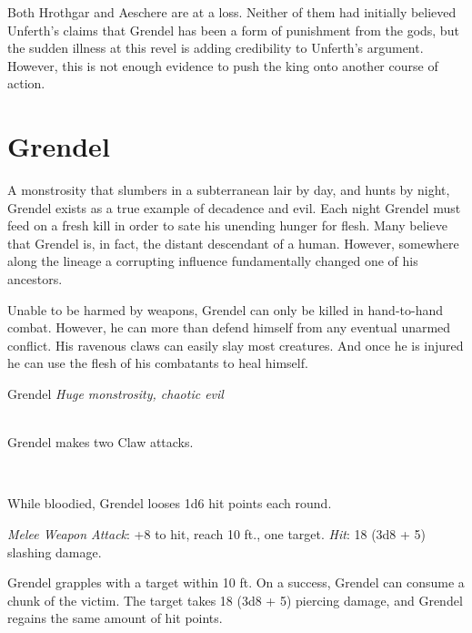 \documentclass[10pt,twoside,twocolumn,openany]{book}
\begin{document}
Both Hrothgar and Aeschere are at a loss. Neither of them had initially believed Unferth's claims that Grendel has been a form of punishment from the gods, but the sudden illness at this revel is adding credibility to Unferth's argument. However, this is not enough evidence to push the king onto another course of action.

\clearpage

\section{\textbf{Grendel}}
A monstrosity that slumbers in a subterranean lair by day, and hunts by night, Grendel exists as a true example of decadence and evil. Each night Grendel must feed on a fresh kill in order to sate his unending hunger for flesh. Many believe that Grendel is, in fact, the distant descendant of a human. However, somewhere along the lineage a corrupting influence fundamentally changed one of his ancestors.

Unable to be harmed by weapons, Grendel can only be killed in hand-to-hand combat. However, he can more than defend himself from any eventual unarmed conflict. His ravenous claws can easily slay most creatures. And once he is injured he can use the flesh of his combatants to heal himself.

\vspace{4.1cm}

\begin{monsterbox}{Grendel}
	\textit{Huge monstrosity, chaotic evil}\\
	\hline
	\basics[%
	armorclass = 12,
	hitpoints  = 105 (10d12 + 40),
	speed      = 60 ft
	]
	\hline
	\stats[
    STR = \stat{25},
    DEX = \stat{8},
    CON = \stat{19},
    INT = \stat{5},
    WIS = \stat{10},
    CHA = \stat{7}
	]
	\hline
	\details[%
	senses = {darkvision 60ft., passive Perception 16},
	languages = {Common, Abyssal},
	damageimmunities = {Any armed attacks},
	damageresistances = {Magic},
	challenge = 5
	]
	\hline \\[1mm]
	\begin{monsteraction}[Multiattack]
		Grendel makes two Claw attacks.
	\end{monsteraction}\\
	\begin{monsteraction}[It Bleeds]
		While bloodied, Grendel looses 1d6 hit points each round.
	\end{monsteraction}
	\begin{monsteraction}[Claw]
		\textit{Melee Weapon Attack}: +8 to hit, reach 10 ft., one target. \textit{Hit}: 18 (3d8 + 5) slashing damage.
	\end{monsteraction}

	\begin{monsteraction}[Consume]
    	Grendel grapples with a target within 10 ft. On a success, Grendel can consume a chunk of the victim. The target takes 18 (3d8 + 5) piercing damage, and Grendel regains the same amount of hit points.
	\end{monsteraction}
\end{monsterbox}
\end{document}
